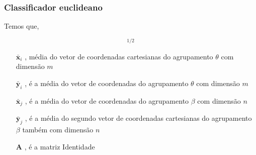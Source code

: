 \documentclass[aspectratio=10]{beamer} %
\begin{document}
\begin{frame}
	\frametitle{Classificador euclideano}
	Temos que, 
	\begin{tcolorbox}[colback=gray!5,colframe=blue!40!black,title=Definição]
		\begin{equation}
		[(\bar{\textbf{x}_{i}}-\bar{\textbf{x}}_{j})^{T}\textbf{A}(\bar{\textbf{y}}_{i}-\bar{\textbf{y}}_{j})]^{1/2} \nonumber
		\label{eq4}
		\end{equation}  
	\end{tcolorbox}
	\pause
	\begin{itemize}
		\centering
		\item[$\bar{\textbf{x}}_{i}$], média do vetor de coordenadas cartesianas do agrupamento $\theta$ com dimensão $m$
		\pause
		\item[$\bar{\textbf{y}}_{i}$], é a média do vetor de coordenadas do agrupamento $\theta$ com dimensão $m$
		\pause
		\item[$\bar{\textbf{x}}_{j}$], é a média do vetor de coordenadas do agrupamento $\beta$ com dimensão $n$
		\pause
		\item[$\bar{\textbf{y}}_{j}$], é a média do segundo vetor de coordenadas cartesianas do agrupamento $\beta$ também com dimensão $n$
		\pause
		\item[$\textbf{A}$], é a matriz Identidade 
	\end{itemize}
\end{frame}
\end{document}
